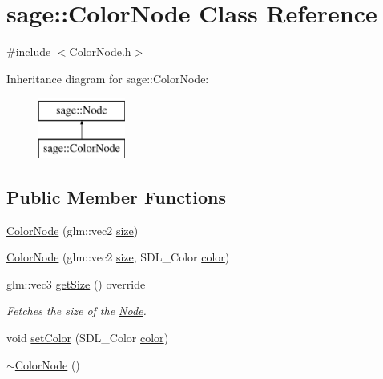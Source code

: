 \hypertarget{classsage_1_1ColorNode}{}\section{sage\+::Color\+Node Class Reference}
\label{classsage_1_1ColorNode}


{\ttfamily \#include $<$Color\+Node.\+h$>$}

Inheritance diagram for sage\+::Color\+Node\+:\begin{figure}[H]
\begin{center}
\leavevmode
\includegraphics[height=2.000000cm]{classsage_1_1ColorNode}
\end{center}
\end{figure}
\subsection*{Public Member Functions}
\begin{DoxyCompactItemize}
\item 
\mbox{\hyperlink{classsage_1_1ColorNode_a2a7235f477d542f28f6bbf1bda63176a}{Color\+Node}} (glm\+::vec2 \mbox{\hyperlink{classsage_1_1ColorNode_a04b687374b9c171ff820c514f15b0ae0}{size}})
\item 
\mbox{\hyperlink{classsage_1_1ColorNode_a104606b1c60c8956f2ab205ce26c9577}{Color\+Node}} (glm\+::vec2 \mbox{\hyperlink{classsage_1_1ColorNode_a04b687374b9c171ff820c514f15b0ae0}{size}}, S\+D\+L\+\_\+\+Color \mbox{\hyperlink{classsage_1_1ColorNode_aad5832e161e608730df9512894725d2d}{color}})
\item 
glm\+::vec3 \mbox{\hyperlink{classsage_1_1ColorNode_ad2ffce290e2cde1697ae609fe0a7b68c}{get\+Size}} () override
\begin{DoxyCompactList}\small\item\em Fetches the size of the \mbox{\hyperlink{classsage_1_1Node}{Node}}. \end{DoxyCompactList}\item 
void \mbox{\hyperlink{classsage_1_1ColorNode_a65747783aeea07d997c54b3ef8d212f8}{set\+Color}} (S\+D\+L\+\_\+\+Color \mbox{\hyperlink{classsage_1_1ColorNode_aad5832e161e608730df9512894725d2d}{color}})
\item 
\mbox{\hyperlink{classsage_1_1ColorNode_af1864690840922c8b14340d6991eac3e}{$\sim$\+Color\+Node}} ()
\end{DoxyCompactItemize}
